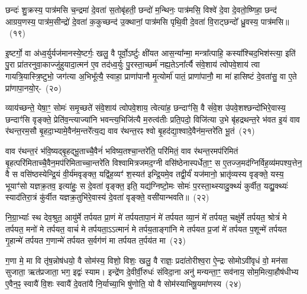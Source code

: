 छन्दः॑ शु॒क्रस्य॒ पात्र॑मसि च॒न्द्रमा॑ दे॒वता॑ स॒तोबृ॑हती॒ छन्दो॑ म॒न्थिनः॒ पात्र॑मसि॒ विश्वे॑ दे॒वा दे॒वतो॒ष्णिहा॒ छन्द॑ आग्रय॒णस्य॒ पात्र॑म॒सीन्द्रो॑ दे॒वता॑ क॒कुच्छन्द॑ उ॒क्थानां॒ पात्र॑मसि पृथि॒वी दे॒वता॑ वि॒राट्छन्दो᳚ ध्रु॒वस्य॒ पात्र॑मसि॥~(१९)

{\anuvakamend[{अ॒न्तरि॑क्षेण बृह॒ती त्रय॑स्त्रिꣳशच्च}]}%

इ॒ष्टर्गो॒ वा अ॑ध्व॒र्युर्यज॑मानस्ये॒ष्टर्गः॒ खलु॒ वै पूर्वो॒\-ऽर्ष्टुः क्षी॑यत आस॒न्या᳚न्मा॒ मन्त्रा᳚त्पाहि॒ कस्या᳚श्चिद॒भिश॑स्त्या॒ इति॑ पु॒रा प्रा॑तरनुवा॒काज्जु॑हुयादा॒त्मन॑ ए॒व तद॑ध्व॒र्युः पु॒रस्ता॒च्छर्म॑ नह्य॒ते\-ऽना᳚र्त्यै संवे॒शाय॑ त्वोपवे॒शाय॑ त्वा गायत्रि॒यास्त्रि॒ष्टुभो॒ जग॑त्या अ॒भिभू᳚त्यै॒ स्वाहा॒ प्राणा॑पानौ मृ॒त्योर्मा॑ पातं॒ प्राणा॑पानौ॒ मा मा॑ हासिष्टं दे॒वता॑सु॒ वा ए॒ते प्रा॑णापा॒नयो॒र्-~(२०)

व्याय॑च्छन्ते॒ येषा॒ꣳ॒ सोमः॑ समृ॒च्छते॑ संवे॒शाय॑ त्वोपवे॒शाय॒ त्वेत्या॑ह॒ छन्दाꣳ॑सि॒ वै सं॑वे॒श उ॑पवे॒शश्छन्दो॑भिरे॒वास्य॒ छन्दाꣳ॑सि वृङ्क्ते॒ प्रेति॑व॒न्त्याज्या॑नि भवन्त्य॒भिजि॑त्यै म॒रुत्व॑तीः प्रति॒पदो॒ विजि॑त्या उ॒भे बृ॑हद्रथन्त॒रे भ॑वत इ॒यं वाव र॑थन्त॒रम॒सौ बृ॒हदा॒भ्यामे॒वैन॑म॒न्तरे᳚त्य॒द्य वाव र॑थन्त॒रꣴ श्वो बृ॒हद॑द्या॒श्वादे॒वैन॑म॒न्तरे॑ति भू॒तं~(२१)

वाव र॑थन्त॒रं भ॑वि॒ष्यद्बृ॒हद्भू॒ताच्चै॒वैनं॑ भविष्य॒तश्चा॒न्तरे॑ति॒ परि॑मितं॒ वाव र॑थन्त॒रमप॑रिमितं बृ॒हत्परि॑मिताच्चै॒वैन॒मप॑रि\-मिताच्चा॒न्तरे॑ति विश्वामित्रजमद॒ग्नी वसि॑ष्ठेनास्पर्धेता॒ꣳ॒ स ए॒तज्ज॒मद॑ग्निर्विह॒व्य॑मपश्य॒त्तेन॒ वै स वसि॑ष्ठस्येन्द्रि॒यं वी॒र्य॑मवृङ्क्त॒ यद्वि॑ह॒व्यꣳ॑ श॒स्यत॑ इन्द्रि॒यमे॒व तद्वी॒र्यं॑ यज॑मानो॒ भ्रातृ॑व्यस्य वृङ्क्ते॒ यस्य॒ भूयाꣳ॑सो यज्ञक्र॒तव॒ इत्या॑हुः॒ स दे॒वता॑ वृङ्क्त॒ इति॒ यद्य॑ग्निष्टो॒मः सोमः॑ प॒रस्ता॒थ्स्यादु॒क्थ्यं॑ कुर्वीत॒ यद्यु॒क्थ्यः॑ स्याद॑तिरा॒त्रं कु॑र्वीत यज्ञक्र॒तुभि॑रे॒वास्य॑ दे॒वता॑ वृङ्क्ते॒ वसी॑यान्भवति॥~(२२)

{\anuvakamend[{प्रा॒णा॒पा॒नयो᳚र्भू॒तं वृ॑ङ्क्ते॒\-ऽष्टाविꣳ॑शतिश्च}]}%

नि॒ग्रा॒भ्याः᳚ स्थ देव॒श्रुत॒ आयु॑र्मे तर्पयत प्रा॒णं मे॑ तर्पयतापा॒नं मे॑ तर्पयत व्या॒नं मे॑ तर्पयत॒ चक्षु॑र्मे तर्पयत॒ श्रोत्रं॑ मे तर्पयत॒ मनो॑ मे तर्पयत॒ वाचं॑ मे तर्पयता॒\-ऽऽ\-त्मानं॑ मे तर्पय॒ताङ्गा॑नि मे तर्पयत प्र॒जां मे॑ तर्पयत प॒शून्मे॑ तर्पयत गृ॒हान्मे॑ तर्पयत ग॒णान्मे॑ तर्पयत स॒र्वग॑णं मा तर्पयत त॒र्पय॑त मा~(२३)

ग॒णा मे॒ मा वि तृ॑ष॒न्नोष॑धयो॒ वै सोम॑स्य॒ विशो॒ विशः॒ खलु॒ वै राज्ञः॒ प्रदा॑तोरीश्व॒रा ऐ॒न्द्रः सोमो\-ऽवी॑वृधं वो॒ मन॑सा सुजाता॒ ऋत॑प्रजाता॒ भग॒ इद्वः॑ स्याम। इन्द्रे॑ण दे॒वीर्वी॒रुधः॑ संविदा॒ना अनु॑ मन्यन्ता॒ꣳ॒ सव॑नाय॒ सोम॒मित्या॒हौष॑धीभ्य ए॒वैन॒ꣴ॒ स्वायै॑ वि॒शः स्वायै॑ दे॒वता॑यै नि॒र्याच्या॒भि षु॑णोति॒ यो वै सोम॑स्याभिषू॒यमा॑णस्य~(२४)

